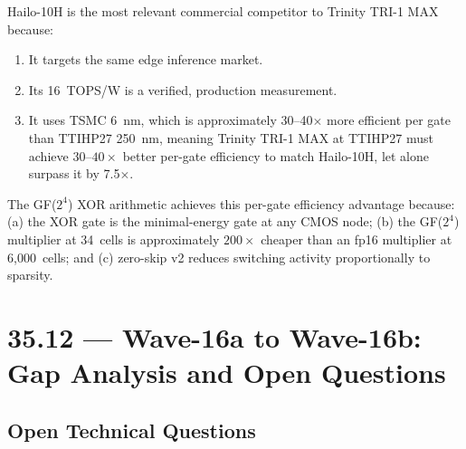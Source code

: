 Hailo-10H is the most relevant commercial competitor to Trinity TRI-1 MAX
because:
\begin{enumerate}
  \item It targets the same edge inference market.
  \item Its 16~TOPS/W is a verified, production measurement.
  \item It uses TSMC 6~nm, which is approximately 30--40\(\times\) more efficient
        per gate than TTIHP27 250~nm, meaning Trinity TRI-1 MAX at TTIHP27 must
        achieve \(30\text{--}40\times\) better per-gate efficiency to match Hailo-10H,
        let alone surpass it by 7.5\(\times\).
\end{enumerate}

The GF(\(2^4\)) XOR arithmetic achieves this per-gate efficiency advantage
because: (a) the XOR gate is the minimal-energy gate at any CMOS node;
(b) the GF(\(2^4\)) multiplier at 34~cells is approximately \(200\times\)
cheaper than an fp16 multiplier at 6,000~cells; and (c) zero-skip v2
reduces switching activity proportionally to sparsity.

\section{35.12 --- Wave-16a to Wave-16b: Gap Analysis and Open Questions}
\label{sec:glava35-gap}

\subsection{Open Technical Questions}

